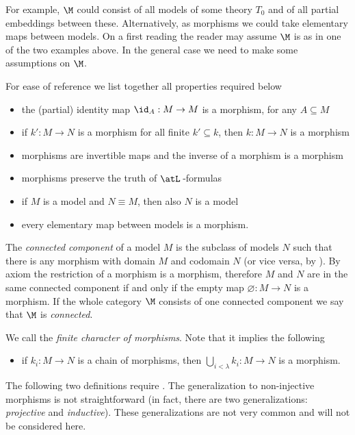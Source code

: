 For example, $\M$ could consist of all models of some theory $T_0$ and of all partial embeddings between these.
Alternatively, as morphisms we could take elementary maps between models.
On a first reading the reader may assume $\M$ is as in one of the two examples above.
In the general case we need to make some assumptions on $\M$.

\begin{definition}\label{def_com_c}For ease of reference we list together all properties required below
\begin{itemize} 
\item[c1.] the (partial) identity map $\id_A:M\to M$ is a morphism, for any $A\subseteq M$
\item[c2.] if $k':M\to N$ is a morphism for all finite $k'\subseteq k$, then $k:M\to N$ is a morphism
\item[c3.] morphisms are invertible maps and the inverse of a morphism is a morphism
\item[c4.] morphisms preserve the truth of $\atL$\,-formulas
\item[c5.] if $M$ is a model and $N\equiv M$, then also $N$ is a model
\item[c6.] every elementary map between models is a morphism.
\end{itemize}
\end{definition}

The \emph{connected component\/} of a model $M$ is the subclass of models $N$ such that there is any morphism with domain $M$ and codomain $N$ (or vice versa, by ).
By axiom  the restriction of a morphism is a morphism, therefore $M$ and $N$ are in the same connected component if and only if the empty map $\varnothing:M\to N$ is a morphism.
If the whole category $\M$ consists of one connected component we say that $\M$ is \emph{connected}.

We call  the \emph{finite character of morphisms}.
Note that it implies the following

\begin{itemize} 
\item[c7.] if $k_i:M\to N$ is a chain of morphisms, then $\displaystyle\bigcup_{i<\lambda} k_i:M\to N$ is a morphism.
\end{itemize}

The following two definitions require .
The generalization to non-injective morphisms is not straightforward (in fact, there are two generalizations: \textit{projective\/} and \textit{inductive\/}).
These generalizations are not very common and will not be considered here.

